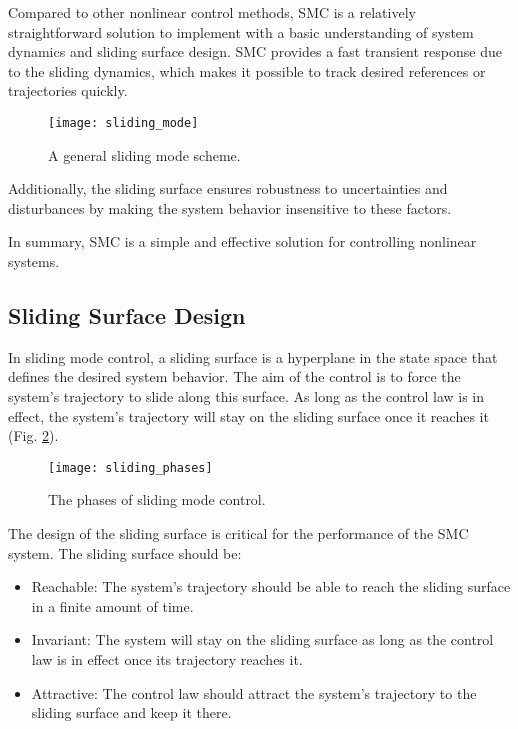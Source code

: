     Compared to other nonlinear control methods, SMC is a relatively straightforward
    solution to implement with a basic understanding of system dynamics and sliding
    surface design. SMC provides a fast transient response due to the sliding dynamics, which makes 
    it possible to track desired references or trajectories quickly.

    \begin{figure}[H]
        \centering\texttt{[image: sliding\_mode]}
        \caption{A general sliding mode scheme.}
        \label{image:sliding_mode}
    \end{figure}

    Additionally, 
    the sliding surface ensures robustness to uncertainties and disturbances by 
    making the system behavior insensitive to these factors. 
    
    In summary, SMC is a simple and effective solution for controlling nonlinear systems.

\subsection{Sliding Surface Design}

    In sliding mode control, a sliding surface is a hyperplane in
    the state space that defines the desired system behavior.
    The aim of the control is to force the system's trajectory to slide
    along this surface. As long as the control law is in effect, 
    the system's trajectory will stay on the sliding surface once it reaches it (Fig. \ref{image:sliding_phases}).

    \begin{figure}[H]
        \centering\texttt{[image: sliding\_phases]}
        \caption{The phases of sliding mode control.}
        \label{image:sliding_phases}
    \end{figure}

    The design of the sliding surface is critical for the performance of the SMC
    system. The sliding surface should be:
    \begin{itemize}
        \item Reachable: The system's trajectory should be able to reach the sliding
            surface in a finite amount of time.
        \item Invariant: The system will stay on the sliding surface as long as the 
        control law is in effect once its trajectory reaches it.
        \item Attractive: The control law should attract the system's trajectory to the
            sliding surface and keep it there.
    \end{itemize}

